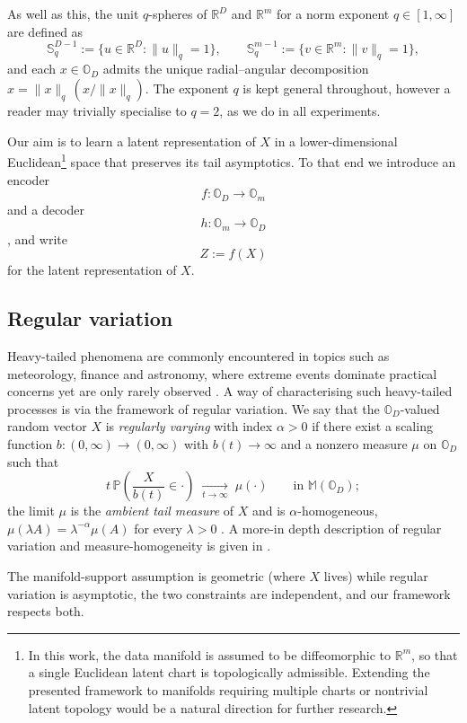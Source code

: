 \documentclass{article}
\theoremstyle{definition}
\newcommand{\RR}{\mathbb{R}}
\begin{document}
As well as this, the unit \(q\)-spheres of \(\mathbb{R}^D\) and \(\mathbb{R}^m\) for a norm exponent \(q\in[1,\infty]\) are defined as
\[
\mathbb{S}^{D-1}_{q} := \{u \in \mathbb{R}^D : \|u\|_q = 1\},
\qquad
\mathbb{S}^{m-1}_{q} := \{v \in \mathbb{R}^m : \|v\|_q = 1\},
\]
and each \(x\in\mathbb{O}_D\) admits the unique radial--angular decomposition \(x = \|x\|_q\,(x/\|x\|_q)\). The exponent \(q\) is kept general throughout, however a reader may trivially specialise to \(q{=}2\), as we do in all experiments.

Our aim is to learn a latent representation of \(X\) in a lower-dimensional Euclidean\footnote{In this work, the data manifold is assumed to be diffeomorphic to \(\RR^m\), so that a single Euclidean latent chart is topologically admissible. Extending the presented framework to manifolds requiring multiple charts or nontrivial latent topology would be a natural direction for further research.} space that preserves its tail asymptotics. To that end we introduce an encoder
\[f:\mathbb{O}_D\to\mathbb{O}_m\] and a decoder \[h:\mathbb{O}_m\to\mathbb{O}_D\], and write
\[
Z := f(X)
\]
for the latent representation of \(X\).

\subsection{Regular variation}
\label{sec:prelim:rv}

Heavy-tailed phenomena are commonly encountered in topics such as meteorology, finance and astronomy, where extreme events dominate practical concerns yet are only rarely observed \cite{resnick_heavy-tail_2007,DeHaan_2006}. A way of characterising such heavy-tailed processes is via the framework of regular variation. We say that the \(\mathbb{O}_D\)-valued random vector \(X\) is \emph{regularly varying} with index \(\alpha>0\) if there exist a scaling function \(b:(0,\infty)\to(0,\infty)\) with \(b(t)\to\infty\) and a nonzero measure \(\mu\) on \(\mathbb{O}_D\) such that
\[
t\,\mathbb{P}\!\left(\frac{X}{b(t)}\in\cdot\right)
\;\xrightarrow[t\to\infty]{}\;
\mu(\cdot)
\qquad\text{in } \mathbb{M}(\mathbb{O}_D);
\]
the limit \(\mu\) is the \emph{ambient tail measure} of \(X\) and is \(\alpha\)-homogeneous, \(\mu(\lambda A)=\lambda^{-\alpha}\mu(A)\) for every \(\lambda>0\) \cite{lindskog_regularly_2014}. A more-in depth description of regular variation and measure-homogeneity is given in .

The manifold-support assumption is geometric (where \(X\) lives) while regular variation is asymptotic, the two constraints are independent, and our framework respects both.
\end{document}
